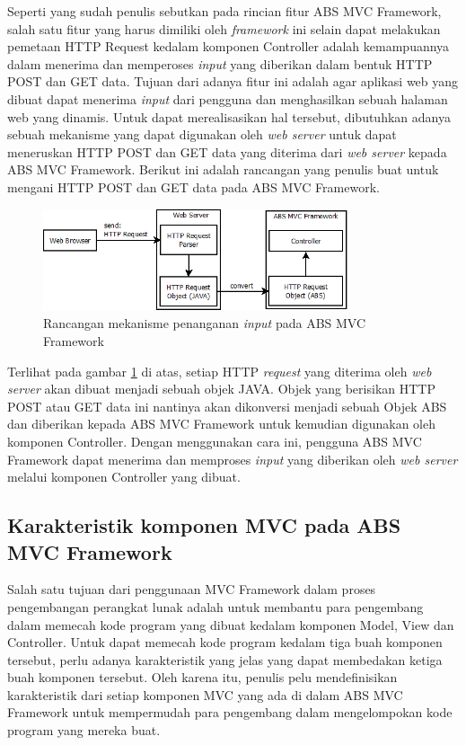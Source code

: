 Seperti yang sudah penulis sebutkan pada rincian fitur ABS MVC Framework, salah satu fitur yang harus dimiliki oleh \textit{framework} ini selain dapat melakukan pemetaan HTTP Request kedalam komponen Controller adalah kemampuannya dalam menerima dan memperoses \textit{input} yang diberikan dalam bentuk HTTP POST dan GET data. Tujuan dari adanya fitur ini adalah agar aplikasi web yang dibuat dapat menerima \textit{input} dari pengguna dan menghasilkan sebuah halaman web yang dinamis. Untuk dapat merealisasikan hal tersebut, dibutuhkan adanya sebuah mekanisme yang dapat digunakan oleh \textit{web server} untuk dapat meneruskan HTTP POST dan GET data yang diterima dari \textit{web server} kepada ABS MVC Framework. Berikut ini adalah rancangan yang penulis buat untuk mengani HTTP POST dan GET data pada ABS MVC Framework.

\begin{figure}
    \centering
    \includegraphics[width=0.8\textwidth]{img/mvc-http-input.png}
    \caption{Rancangan mekanisme penanganan \textit{input} pada ABS MVC Framework}
    \label{fig:mvcHttpInputMechanism}
\end{figure}

Terlihat pada gambar \ref{fig:mvcHttpInputMechanism} di atas, setiap HTTP \textit{request} yang diterima oleh \textit{web server} akan dibuat menjadi sebuah objek JAVA. Objek yang berisikan HTTP POST atau GET data ini nantinya akan dikonversi menjadi sebuah Objek ABS dan diberikan kepada ABS MVC Framework untuk kemudian digunakan oleh komponen Controller. Dengan menggunakan cara ini, pengguna ABS MVC Framework dapat menerima dan memproses \textit{input} yang diberikan oleh \textit{web server} melalui komponen Controller yang dibuat.

\subsection{Karakteristik komponen MVC pada ABS MVC Framework}

Salah satu tujuan dari penggunaan MVC Framework dalam proses pengembangan perangkat lunak adalah untuk membantu para pengembang dalam memecah kode program yang dibuat kedalam komponen Model, View dan Controller. Untuk dapat memecah kode program kedalam tiga buah komponen tersebut, perlu adanya karakteristik yang jelas yang dapat membedakan ketiga buah komponen tersebut. Oleh karena itu, penulis pelu mendefinisikan karakteristik dari setiap komponen MVC yang ada di dalam ABS MVC Framework untuk mempermudah para pengembang dalam mengelompokan kode program yang mereka buat.\\

